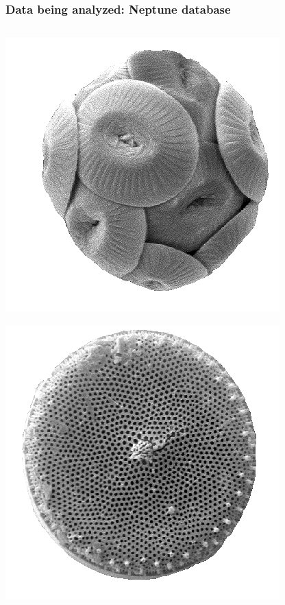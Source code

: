 \documentclass[aspectratio=169]{beamer}
\begin{document}
\begin{frame}
  \frametitle{Data being analyzed: Neptune database}

  \begin{columns}
    \begin{column}{0.1\textwidth}
      \begin{center}
        \includegraphics[width=\textwidth,height=0.15\textheight,keepaspectratio=true]{figure/calc}

        \includegraphics[width=\textwidth,height=0.15\textheight,keepaspectratio=true]{figure/diatom}


\end{center}
\end{column}
\end{columns}
\end{frame}
\end{document}
